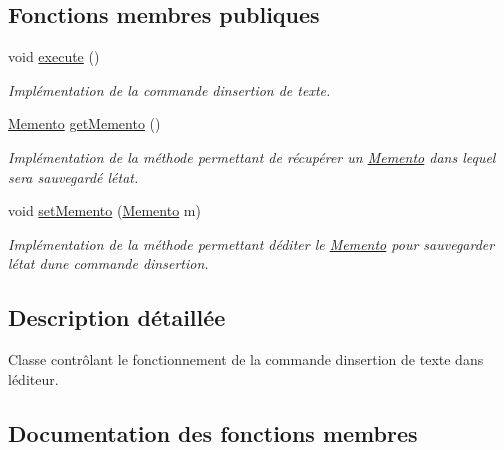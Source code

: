 \subsection*{Fonctions membres publiques}
\begin{DoxyCompactItemize}
\item 
void \hyperlink{classfr_1_1istic_1_1m1_1_1aco_1_1miniediteur_1_1v1_1_1Inserer_acbf4c75249a1836789c8ab4dcc7dcb0d}{execute} ()
\begin{DoxyCompactList}\small\item\em Implémentation de la commande d\textquotesingle{}insertion de texte. \end{DoxyCompactList}\item 
\hyperlink{interfacefr_1_1istic_1_1m1_1_1aco_1_1miniediteur_1_1v1_1_1Memento}{Memento} \hyperlink{classfr_1_1istic_1_1m1_1_1aco_1_1miniediteur_1_1v1_1_1Inserer_a4091c321237a04db9509b01e2baf768f}{get\+Memento} ()
\begin{DoxyCompactList}\small\item\em Implémentation de la méthode permettant de récupérer un \hyperlink{interfacefr_1_1istic_1_1m1_1_1aco_1_1miniediteur_1_1v1_1_1Memento}{Memento} dans lequel sera sauvegardé l\textquotesingle{}état. \end{DoxyCompactList}\item 
void \hyperlink{classfr_1_1istic_1_1m1_1_1aco_1_1miniediteur_1_1v1_1_1Inserer_a1978002e0aa031a5293ff3263c49fe94}{set\+Memento} (\hyperlink{interfacefr_1_1istic_1_1m1_1_1aco_1_1miniediteur_1_1v1_1_1Memento}{Memento} m)
\begin{DoxyCompactList}\small\item\em Implémentation de la méthode permettant d\textquotesingle{}éditer le \hyperlink{interfacefr_1_1istic_1_1m1_1_1aco_1_1miniediteur_1_1v1_1_1Memento}{Memento} pour sauvegarder l\textquotesingle{}état d\textquotesingle{}une commande d\textquotesingle{}insertion. \end{DoxyCompactList}\end{DoxyCompactItemize}


\subsection{Description détaillée}
Classe contrôlant le fonctionnement de la commande d\textquotesingle{}insertion de texte dans l\textquotesingle{}éditeur. 

\subsection{Documentation des fonctions membres}
\mbox{\label{classfr_1_1istic_1_1m1_1_1aco_1_1miniediteur_1_1v1_1_1Inserer_acbf4c75249a1836789c8ab4dcc7dcb0d}} 

